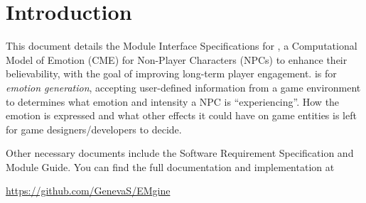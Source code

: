 \section{Introduction}
This document details the Module Interface Specifications for \progname{}, a
Computational Model of Emotion (CME) for Non-Player Characters (NPCs) to
enhance their believability, with the goal of improving long-term player
engagement. \progname{} is for \textit{emotion generation}, accepting
user-defined information from a game environment to determines what emotion
and intensity a NPC is ``experiencing''. How the emotion is expressed and what
other effects it could have on game entities is left for game
designers/developers to decide.

Other necessary documents include the Software Requirement Specification and
Module Guide. You can find the full documentation and implementation at
\begin{center}
    \href{https://github.com/GenevaS/EMgine}{https://github.com/GenevaS/EMgine}
\end{center}
